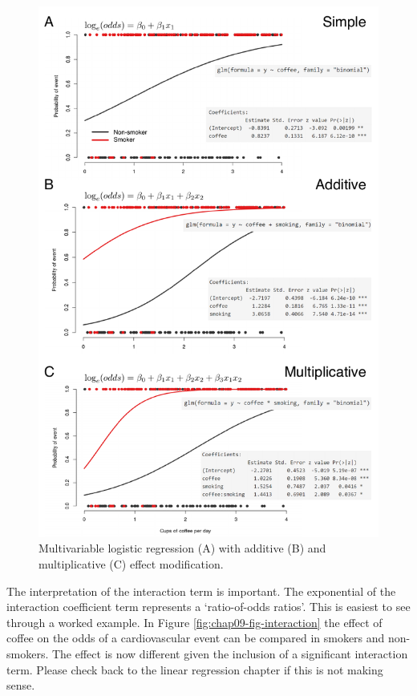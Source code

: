 \documentclass[
  12pt,
  krantz2]{krantz}
\begin{document}
\begin{figure}
\centering
\includegraphics{images/chapter09/6_types.pdf}
\caption{\label{fig:chap09-fig-types}Multivariable logistic regression (A) with additive (B) and multiplicative (C) effect modification.}
\end{figure}

The interpretation of the interaction term is important.
The exponential of the interaction coefficient term represents a `ratio-of-odds ratios'.
This is easiest to see through a worked example.
In Figure \ref{fig:chap09-fig-interaction} the effect of coffee on the odds of a cardiovascular event can be compared in smokers and non-smokers.
The effect is now different given the inclusion of a significant interaction term.
Please check back to the linear regression chapter if this is not making sense.
\end{document}
